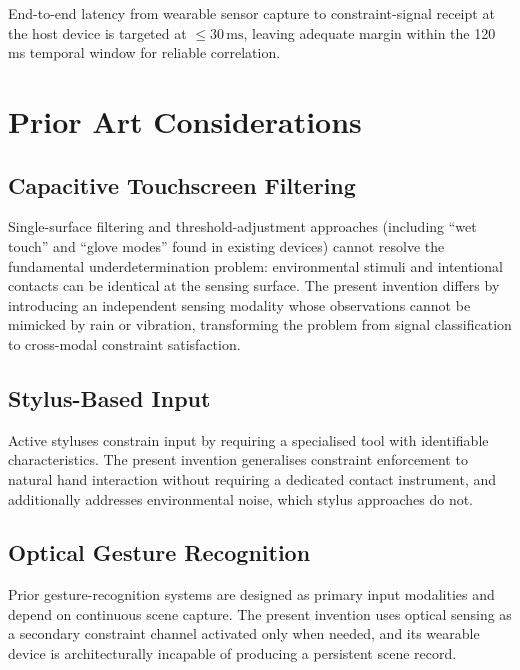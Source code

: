 \documentclass[11pt,letterpaper]{article}
\begin{document}
End-to-end latency from wearable sensor capture to constraint-signal receipt at the
host device is targeted at $\leq 30\,\mathrm{ms}$, leaving adequate margin within
the 120\,ms temporal window for reliable correlation.

\section{Prior Art Considerations}

\subsection{Capacitive Touchscreen Filtering}

Single-surface filtering and threshold-adjustment approaches (including ``wet touch''
and ``glove modes'' found in existing devices) cannot resolve the fundamental
underdetermination problem: environmental stimuli and intentional contacts can be
identical at the sensing surface. The present invention differs by introducing an
independent sensing modality whose observations cannot be mimicked by rain or
vibration, transforming the problem from signal classification to cross-modal
constraint satisfaction.

\subsection{Stylus-Based Input}

Active styluses constrain input by requiring a specialised tool with identifiable
characteristics. The present invention generalises constraint enforcement to natural
hand interaction without requiring a dedicated contact instrument, and additionally
addresses environmental noise, which stylus approaches do not.

\subsection{Optical Gesture Recognition}

Prior gesture-recognition systems are designed as primary input modalities and
depend on continuous scene capture. The present invention uses optical sensing as a
secondary constraint channel activated only when needed, and its wearable device is
architecturally incapable of producing a persistent scene record.
\end{document}
